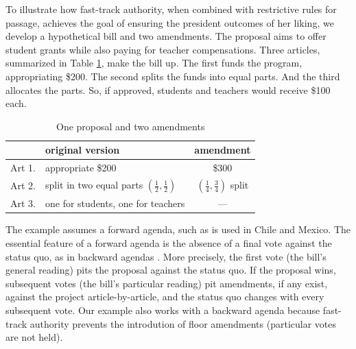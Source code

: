 \documentclass[letter,12pt]{article}
\begin{document}
To illustrate how fast-track authority, when combined with restrictive rules for passage, achieves the goal of ensuring the president outcomes of her liking, we develop a hypothetical bill and two amendments. The proposal aims to offer student grants while also paying for teacher compensations. Three articles, summarized in Table \ref{T:example}, make the bill up. The first funds the program, appropriating \$200. The second splits the funds into equal parts. And the third allocates the parts. So, if approved, students and teachers would receive \$100 each. 

\begin{table}
\centering
\caption{One proposal and two amendments}\label{T:example}
\noindent \begin{tabular}{llc}
       & original version                   & amendment                                        \\ \hline
Art 1. & appropriate \$200                  & \$300                                            \\
Art 2. & split in two equal parts $(\frac{1}{2}, \frac{1}{2})$          & $(\frac{1}{4}, \frac{3}{4})$ split \\
Art 3. & one for students, one for teachers & ---                                              \\
\end{tabular}
\end{table}

The example assumes a forward agenda, such as is used in Chile and Mexico. The essential feature of a forward agenda is the absence of a final vote against the status quo, as in backward agendas \citep{heller.weldon.2003,schwartz.2008}. More precisely, the first vote (the bill's general reading) pits the proposal against the status quo. If the proposal wins, subsequent votes (the bill's particular reading) pit amendments, if any exist, against the project article-by-article, and the status quo changes with every subsequent vote. Our example also works with a backward agenda because fast-track authority prevents the introdution of floor amendments (particular votes are not held).  
\end{document}
